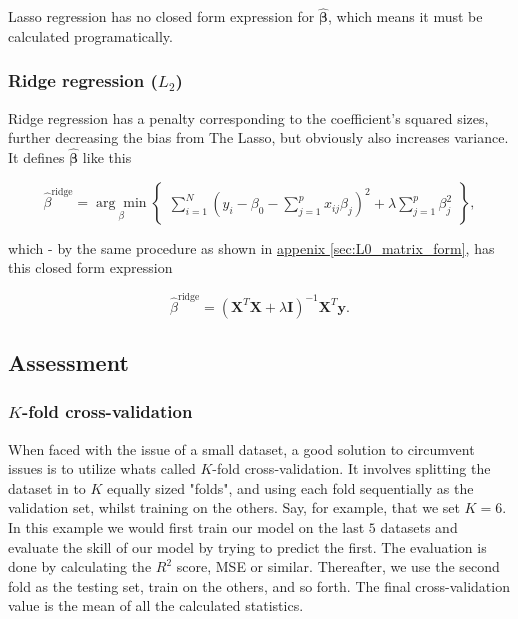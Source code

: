 Lasso regression has no closed form expression for $\hat{\mathbf \beta}$, which means it must be calculated programatically.


\subsubsection{Ridge regression ($L_2$)}\label{rid}
Ridge regression has a penalty corresponding to the coefficient's squared sizes, further decreasing the bias from The Lasso, but obviously also increases variance. It defines $\hat{\mathbf \beta}$ like this

\begin{equation*}
  \hat \beta^{\text{ridge}} = \underset{\beta}{\arg \min} \begin{Bmatrix}\sum_{i=1}^N\left(y_i - \beta_0 - \sum_{j=1}^p x_{ij}\beta_j\right)^2 + \lambda \sum_{j=1}^p \beta_j^2 \end{Bmatrix},
\end{equation*}

which - by the same procedure as shown in \hyperref[sec:L0_matrix_form]{appenix \ref*{sec:L0_matrix_form}}, has this closed form expression

\begin{equation}
  \hat \beta^{\text{ridge}} = (\mathbf X^T\mathbf X + \lambda \mathbf I)^{-1}\mathbf X^T\mathbf y.
\end{equation}

\subsection{Assessment}
\subsubsection{$K$-fold cross-validation}
When faced with the issue of a small dataset, a good solution to circumvent issues is to utilize whats called $K$-fold cross-validation. It involves splitting the dataset in to $K$ equally sized "folds", and using each fold sequentially as the validation set, whilst training on the others. Say, for example, that we set $K=6$. In this example we would first train our model on the last $5$ datasets and evaluate the skill of our model by trying to predict the first. The evaluation is done by calculating the $R^2$ score, MSE or similar. Thereafter, we use the second fold as the testing set, train on the others, and so forth. The final cross-validation value is the mean of all the calculated statistics.

